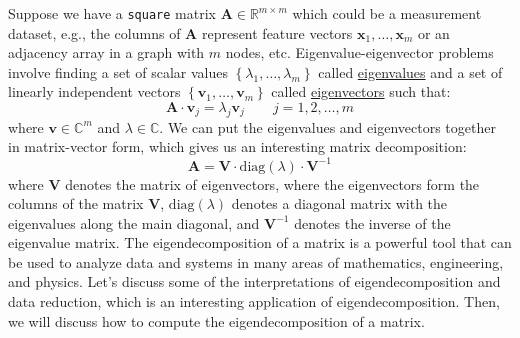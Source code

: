 \documentclass{article}[11pt]
\begin{document}
Suppose we have a \texttt{square} matrix $\mathbf{A}\in\mathbb{R}^{m\times{m}}$ which could be a measurement dataset, e.g., the columns of $\mathbf{A}$ represent feature 
vectors $\mathbf{x}_{1},\dots,\mathbf{x}_{m}$ or an adjacency array in a graph with $m$ nodes, etc. Eigenvalue-eigenvector problems involve finding a set of scalar values $\left\{\lambda_{1},\dots,\lambda_{m}\right\}$ called 
\href{https://mathworld.wolfram.com/Eigenvalue.html}{eigenvalues} and a set of linearly independent vectors 
$\left\{\mathbf{v}_{1},\dots,\mathbf{v}_{m}\right\}$ called \href{https://mathworld.wolfram.com/Eigenvector.html}{eigenvectors} such that:
\begin{equation}
\mathbf{A}\cdot\mathbf{v}_{j} = \lambda_{j}\mathbf{v}_{j}\qquad{j=1,2,\dots,m}
\end{equation}
where $\mathbf{v}\in\mathbb{C}^{m}$ and $\lambda\in\mathbb{C}$. We can put the eigenvalues and eigenvectors together in matrix-vector form, which gives us an interesting matrix decomposition:
\begin{equation}
\mathbf{A} = \mathbf{V}\cdot\text{diag}(\lambda)\cdot\mathbf{V}^{-1}
\end{equation}
where $\mathbf{V}$ denotes the matrix of eigenvectors, where the eigenvectors form the columns of the matrix $\mathbf{V}$, $\text{diag}(\lambda)$ denotes a diagonal matrix with the eigenvalues along the main diagonal, 
and $\mathbf{V}^{-1}$ denotes the inverse of the eigenvalue matrix.
The eigendecomposition of a matrix is a powerful tool that can be used to analyze data and systems in many areas of mathematics, engineering, and physics.
Let's discuss some of the interpretations of eigendecomposition and data reduction, which is an interesting application of eigendecomposition. Then, we will discuss how to compute the eigendecomposition of a matrix.
\end{document}
